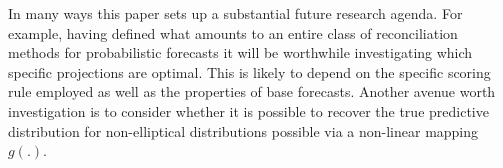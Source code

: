 \documentclass[a4paper, 11pt]{article}
\theoremstyle{theo}
\theoremstyle{definition}
\begin{document}
In many ways this paper sets up a substantial future research agenda.  For example, having defined what amounts to an entire class of reconciliation methods for probabilistic forecasts it will be worthwhile investigating which specific projections are optimal.  This is likely to depend on the specific scoring rule employed as well as the properties of base forecasts.  Another avenue worth investigation is to consider whether it is possible to recover the true predictive distribution for non-elliptical distributions possible via a non-linear mapping $g(.)$.





\newpage
\printbibliography
\end{document}
